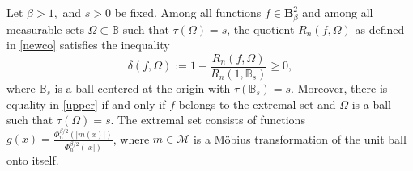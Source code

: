 \documentclass[a4paper,10pt]{amsart}
\begin{document}
\begin{numthm}\label{thm:main}\cite{RamosTilli, kalajramos2024}
Let $\beta>1,$ and $s>0$ be fixed. Among all functions $f\in \mathbf{B}^2_\beta$ and among
all measurable sets $\Omega\subset  \mathbb{B}$ such that $\tau(\Omega)=s$, the quotient
$R_n(f,\Omega)$ as defined in \eqref{newco} satisfies the inequality
\begin{equation}\label{upper}
	\delta(f,\Omega):=1-\frac{R_n(f,\Omega)}{ R_n(1, \mathbb{B}_s)}\ge 0,
\end{equation}
where $ \mathbb{B}_s$ is a ball centered at the origin with $\tau( \mathbb{B}_s) = s.$
Moreover, there is equality in \eqref{upper} if and only if $f$ belongs to the extremal set
and $\Omega$ is a ball such that $\tau(\Omega)=s$. The extremal set consists of functions
$g(x) = \frac{\Phi_n^{\beta/2}(|m(x)|)}{\Phi_n^{\beta/2}(|x|)}$, where
$m\in\mathcal{M}$ is a M\"obius transformation of the unit ball onto itself.
\end{numthm}

\end{document}
